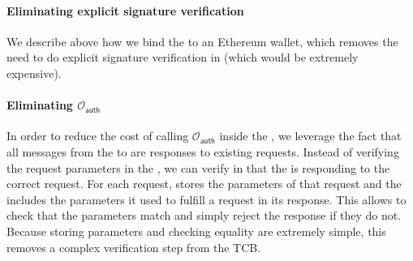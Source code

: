 \iffalse
As described in Section~\ref{sec:architecture}, \tc has two trusted components: the \encname and \tcont.
These components must communicate with each other, but can only do so over insecure channels (through the \medname).
Moreover, these components comprise very different properties.
\tcont resides on the blockchain where users can interact directly with \tc and all computation is verifiable, expensive, and transparent.
The \encname provides a private and less expensive environment, but all interaction (user or otherwise) must go through an untrusted intermediary.

The simplest way to ensure authentic communication between the components is to have both perform verification;
\tcont receives signed messages from the \encname and verifies the signatures,
and the \encname receives raw blocks and verifies that they are well-formed.
Unfortunately, both of these verification mechanisms require a large amount of computation and complex code.
\fi

\paragraph{Eliminating explicit signature verification}

We describe above how we bind the \encname to an Ethereum wallet, which removes the need to do explicit signature verification in \tcont (which would be extremely expensive).

\paragraph{Eliminating $\mathcal{O}_\textsf{auth}$}

In order to reduce the cost of calling $\mathcal{O}_\textsf{auth}$ inside the \encname, we leverage the fact that all messages from the \encname to \tcont are responses to existing requests.
Instead of verifying the request parameters in the \encname, we can verify in \tcont that the \encname is responding to the correct request.
For each request, \tcont stores the parameters of that request and the \encname includes the parameters it used to fulfill a request in its response.
This allows \tcont to check that the parameters match and simply reject the response if they do not.
Because storing parameters and checking equality are extremely simple, this removes a complex verification step from the TCB.

